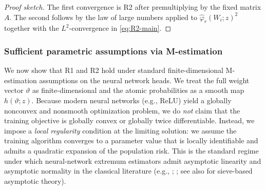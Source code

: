 \documentclass[accepted]{uai2026} %
\theoremstyle{plain}
\theoremstyle{definition}
\theoremstyle{remark}
\begin{document}
\begin{proof}[Proof sketch]
The first convergence is R2 after premultiplying by the fixed matrix $A$.
The second follows by the law of large numbers applied to
$\hat\varphi_r(W_i;z)^2$ together with the $L^2$-convergence in
\eqref{eq:R2-main}.
\end{proof}

\subsubsection{Sufficient parametric assumptions via M-estimation}
\label{subsubsec:parametric-sufficient}

We now show that R1 and R2 hold under standard finite-dimensional
M-estimation assumptions on the neural network heads. We treat the full weight
vector $\vartheta$ as finite-dimensional and the atomic probabilities as a
smooth map $h(\vartheta;z)$.
Because modern neural networks (e.g., ReLU) yield a globally nonconvex and
nonsmooth optimization problem, we do \emph{not} claim that the training objective
is globally convex or globally twice differentiable. Instead, we impose a
\emph{local regularity} condition at the limiting solution: we assume the training
algorithm converges to a parameter value that is locally identifiable and admits
a quadratic expansion of the population risk. This is the standard regime under
which neural-network extremum estimators admit asymptotic linearity and
asymptotic normality in the classical literature (e.g., \citep{white1989JASA};
\citep{chenwhite1999IT}; see also \citep{shen2023sieve} for sieve-based
asymptotic theory).
\end{document}
